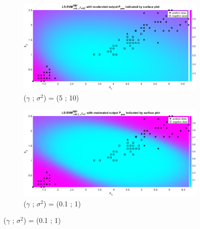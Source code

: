 {\begin{figure}[!htbp]
\begin{subfigure}{.33\textwidth}
		\label{fig:gam5_sig1}
	\end{subfigure}%
	\begin{subfigure}{.33\textwidth}
		\centering
		\includegraphics[height=0.8\linewidth,width=1\linewidth]{Exercise1/Report/Ex1.3.4_gam5_sig10.eps}
		\caption{($\gamma$ ; $\sigma^2$) = (5 ; 10)}
		\label{fig:gam5_sig10}
	\end{subfigure}
	\begin{subfigure}{.33\textwidth}
		\centering
		\includegraphics[height=0.8\linewidth,width=1\linewidth]{Exercise1/Report/Ex1.3.4_gam0.1_sig1.eps}
		\caption{($\gamma$ ; $\sigma^2$) = (0.1 ; 1)}

\end{subfigure}
\end{figure}}
